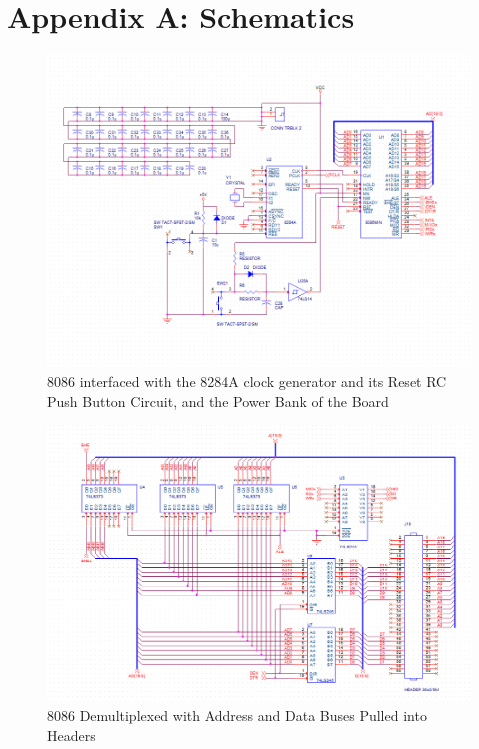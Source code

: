 \newpage

\appendix {}

    \section{Appendix A: Schematics} \label{appendix:schematics}

        \begin{figure}[ht]
            \begin{center}
                \includegraphics[width=1\textwidth]{figures/schematics/page1.png}
                \caption{8086 interfaced with the 8284A clock generator and its Reset RC Push Button Circuit, and the Power Bank of the Board} \label{fig:page1}
            \end{center}
        \end{figure}

        \begin{figure}[ht]
            \begin{center}
                \includegraphics[width=1\textwidth]{figures/schematics/page2.png}
                \caption{8086 Demultiplexed with Address and Data Buses Pulled into Headers} \label{fig:page2}
            \end{center}
        \end{figure}

